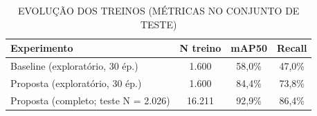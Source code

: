 \begin{table}[H]
    \centering
    \footnotesize
        \caption{EVOLUÇÃO DOS TREINOS (MÉTRICAS NO CONJUNTO DE TESTE)}
        \label{tab:comparacao_treinos}
        \begin{tabular}{lccc}
            \toprule
            \textbf{Experimento} & \textbf{N treino} & \textbf{mAP50} & \textbf{Recall} \\
            \midrule
            Baseline (exploratório, 30 ép.) & 1.600 & 58,0\% & 47,0\% \\
            Proposta (exploratório, 30 ép.) & 1.600 & 84,4\% & 73,8\% \\
            Proposta (completo; teste N = 2.026) & 16.211 & 92,9\% & 86,4\% \\
        \bottomrule
    \end{tabular}
\end{table}

